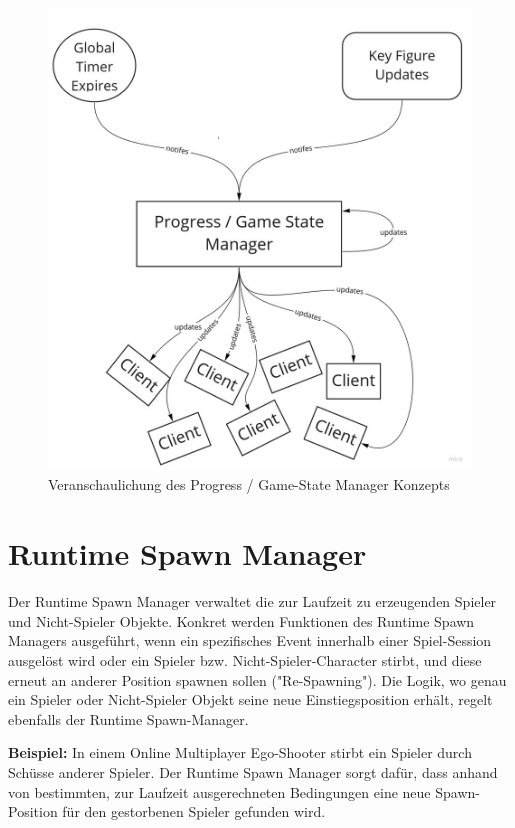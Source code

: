 \begin{figure}
	\centering
	\includegraphics[width=150mm]{images/Progress_State_Manager.jpg}
	\caption[Progress / Game-State Manager]{Veranschaulichung des Progress / Game-State Manager Konzepts}
	\label{pic:Progress_State_Manager}
\end{figure}

\section{Runtime Spawn Manager}
\label{spawn_manager}

Der Runtime Spawn Manager verwaltet die zur Laufzeit zu erzeugenden Spieler und Nicht-Spieler Objekte. Konkret werden Funktionen des Runtime Spawn Managers ausgeführt, wenn ein spezifisches Event innerhalb einer Spiel-Session ausgelöst wird oder ein Spieler bzw. Nicht-Spieler-Character stirbt, und diese erneut an anderer Position spawnen sollen ("Re-Spawning"). Die Logik, wo genau ein Spieler oder Nicht-Spieler Objekt seine neue Einstiegsposition erhält, regelt ebenfalls der Runtime Spawn-Manager.

\textbf{Beispiel:} In einem Online Multiplayer Ego-Shooter \cite{Wikipedia.2021g} stirbt ein Spieler durch Schüsse anderer Spieler. Der Runtime Spawn Manager sorgt dafür, dass anhand von bestimmten, zur Laufzeit ausgerechneten Bedingungen eine neue Spawn-Position für den gestorbenen Spieler gefunden wird. 

